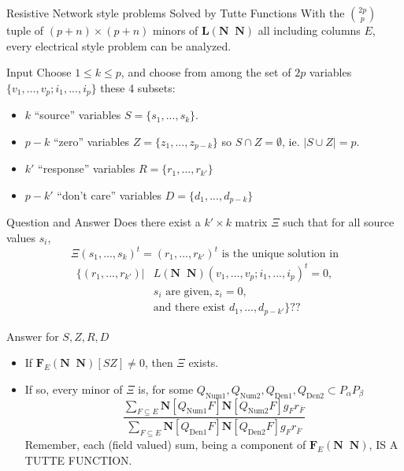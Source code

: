 \documentclass{beamer}
\newcommand{\ext}[1]{\ensuremath{\mathbf{#1}}}
\begin{document}
\begin{frame}{Resistive Network style problems Solved by Tutte Functions}
  With the $\binom{2p}{p}$ tuple of $(p+n)\times(p+n)$
  minors of $\ext{L}(\ext{N}\;\;\ext{N})$ all including columns $E$, every electrical style
  problem can be analyzed.
  \begin{block}{Input}
    Choose $1\le k\le p$, and choose from among the set of $2p$ variables
    $\{v_1,...,v_p;i_1,...,i_p\}$ these 4 subsets:
    \begin{itemize}
    \item $k$ ``source'' variables $S=\{s_1,...,s_k\}$.
    \item $p-k$ ``zero'' variables $Z=\{z_1,...,z_{p-k}\}$ so $S\cap Z=\emptyset$, ie. $|S\cup Z|=p$.
    \item $k'$ ``response'' variables $R=\{r_1,...,r_{k'}\}$
    \item $p-k'$ ``don't care'' variables $D=\{d_1,...,d_{p-k}\}$ 
    \end{itemize}
  \end{block}
\end{frame}

\begin{frame}{Question and Answer}
    Does there exist a $k'\times k$ matrix $\Xi$ such that for all source values $s_i$,
    \[
    \Xi(s_1,...,s_k)^t = (r_1,...,r_{k'})^t \text{\ is the unique solution in}
    \]
    \[
    \begin{split}    \{ (r_1,...,r_{k'}) |& L( \ext{N}\;\;\ext{N} )(v_1,...,v_p;i_1,...,i_p)^t = 0,\\
      & s_i \text{\ are given}, z_i=0,\\
      &\text{and there exist\ } d_1,...,d_{p-k'}\}??
    \end{split}
    \]
  \begin{block}{Answer for $S,Z,R,D$}
    \begin{itemize}
     \item
        If $\ext{F}_E(\ext{N}\;\;\ext{N})[SZ]\not=0$, then $\Xi$ exists.

      \item
        If so, every minor of $\Xi$ is, for some
        $Q_{\text{Num1}},Q_{\text{Num2}},Q_{\text{Den1}},Q_{\text{Den2}}\subset P_\alpha P_\beta$
        \[
        \frac{\sum_{F\subseteq E}\ext{N}[Q_{\text{Num1}}F]\ext{N}[Q_{\text{Num2}}F]g_Fr_{\overline{F}}}
          {\sum_{F\subseteq E}\ext{N}[Q_{\text{Den1}}F]\ext{N}[Q_{\text{Den2}}F]g_Fr_{\overline{F}}}
          \]
          Remember, each (field valued) sum, being a component of
          $\ext{F}_E(\ext{N}\;\;\ext{N})$,  IS A TUTTE FUNCTION.
    \end{itemize}
  \end{block}
\end{frame}
          
\end{document}
